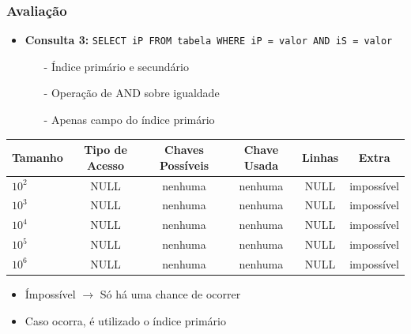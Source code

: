 \documentclass[10pt]{beamer}
\begin{document}
\begin{frame}[fragile]
  \frametitle{Avaliação}

    \begin{itemize}
      \item \textbf{Consulta 3: } \footnotesize{\texttt{SELECT iP FROM tabela WHERE iP = valor AND iS = valor}}
      \begin{itemize}
        \item[-] Índice primário e secundário
        \item[-] Operação de AND sobre igualdade
        \item[-] Apenas campo do índice primário
      \end{itemize}

    \end{itemize}

     \begin{table}[!htb]
    \footnotesize
    \centering
    \begin{tabular}{lccccc}
      \toprule
      \textbf{Tamanho} & \textbf{Tipo de Acesso}  & \textbf{Chaves Possíveis}  & \textbf{Chave Usada} & \textbf{Linhas} & \textbf{Extra}  \\
      \midrule
      $10^2$  & NULL  &  nenhuma  & nenhuma  & NULL  & impossível \\
      $10^3$  & NULL  &  nenhuma  & nenhuma  & NULL  & impossível \\
      $10^4$  & NULL  &  nenhuma  & nenhuma  & NULL  & impossível \\
      $10^5$  & NULL  &  nenhuma  & nenhuma  & NULL  & impossível \\
      $10^6$  & NULL  &  nenhuma  & nenhuma  & NULL  & impossível \\

      \bottomrule
    \end{tabular}
    \end{table}
   
    \begin{itemize}
    \item Ímpossível $\to$ Só há uma chance de ocorrer
    \item Caso ocorra, é utilizado o índice primário
    \end{itemize}


\end{frame}
\end{document}
